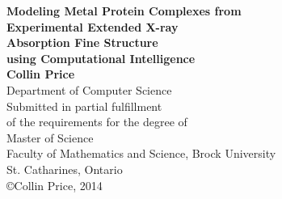 \begin{titlepage}
\begin{center}

{\LARGE {\bf Modeling Metal Protein Complexes from}}
\\[0.2cm]{\LARGE {\bf Experimental Extended X-ray }}
\\[0.2cm]{\LARGE {\bf Absorption Fine Structure}}
\\[0.2cm]{\LARGE {\bf using Computational Intelligence}}
\\[3cm]
{\Large{ \bf Collin Price}}
\\[0.5cm]
{\large Department of Computer Science}
\\[3cm]
{\large Submitted in partial fulfillment\\
of the requirements for the degree of}
\\[1cm]
{\large Master of Science}
\\[1cm]
{\large Faculty of Mathematics and Science, Brock University\\
St. Catharines, Ontario}
\\[4cm]
\copyright Collin Price, 2014

\end{center}
\end{titlepage}

